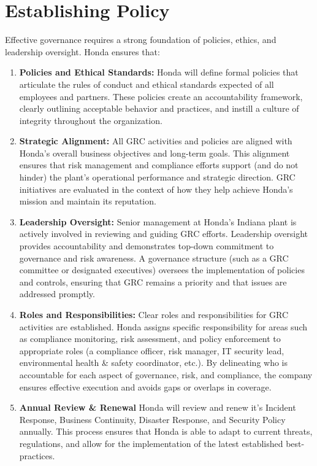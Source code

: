 \section{Establishing Policy}
Effective governance requires a strong foundation of policies, ethics, and leadership oversight. Honda ensures that:
\begin{enumerate}
    \item \textbf{Policies and Ethical Standards:} Honda will define formal policies that articulate the rules of conduct and ethical standards expected of all employees and partners. These policies create an accountability framework, clearly outlining acceptable behavior and practices, and instill a culture of integrity throughout the organization.
    \item \textbf{Strategic Alignment:} All GRC activities and policies are aligned with Honda's overall business objectives and long-term goals. This alignment ensures that risk management and compliance efforts support (and do not hinder) the plant’s operational performance and strategic direction. GRC initiatives are evaluated in the context of how they help achieve Honda’s mission and maintain its reputation.
    \item \textbf{Leadership Oversight:} Senior management at Honda’s Indiana plant is actively involved in reviewing and guiding GRC efforts. Leadership oversight provides accountability and demonstrates top-down commitment to governance and risk awareness. A governance structure (such as a GRC committee or designated executives) oversees the implementation of policies and controls, ensuring that GRC remains a priority and that issues are addressed promptly.
    \item \textbf{Roles and Responsibilities:} Clear roles and responsibilities for GRC activities are established. Honda assigns specific responsibility for areas such as compliance monitoring, risk assessment, and policy enforcement to appropriate roles (a compliance officer, risk manager, IT security lead, environmental health \& safety coordinator, etc.). By delineating who is accountable for each aspect of governance, risk, and compliance, the company ensures effective execution and avoids gaps or overlaps in coverage.
    \item \textbf{Annual Review \& Renewal} Honda will review and renew it's Incident Response, Business Continuity, Disaster Response, and Security Policy annually. This process ensures that Honda is able to adapt to current threats, regulations, and allow for the implementation of the latest established best-practices.
\end{enumerate}


